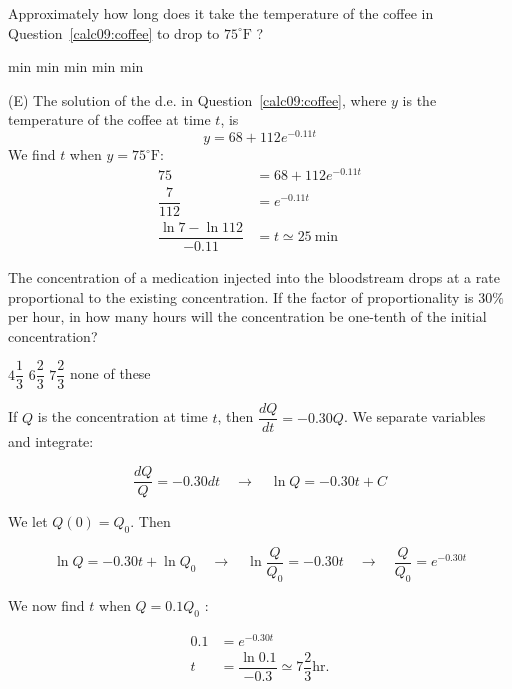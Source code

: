 \question
Approximately how long does it take the temperature of the coffee in Question~\ref{calc09:coffee} to drop to $75^{\circ} \mathrm{F}$ ?
\begin{choices}
   min
   min
   min
   min
   min
\end{choices}
\begin{solution}
(E) The solution of the d.e. in Question~\ref{calc09:coffee}, where $y$ is the temperature of the coffee at time $t$, is
\[
y=68+112 e^{-0.11 t}
\]
We find $t$ when $y=75^{\circ} \mathrm{F}$:
\[
\begin{aligned}
75 & =68+112 e^{-0.11 t} \\
\dfrac{7}{112} & =e^{-0.11 t} \\
\dfrac{\ln 7-\ln 112}{-0.11} & =t \simeq 25 \mathrm{~min}
\end{aligned}
\]
\end{solution}




\newpage



\question
The concentration of a medication injected into the bloodstream drops at a rate proportional to the existing concentration. If the factor of proportionality is $30 \%$ per hour, in how many hours will the concentration be one-tenth of the initial concentration?
\begin{choices}
  \choice $4 \dfrac{1}{3}$
  \choice $6 \dfrac{2}{3}$
  \CorrectChoice $7 \dfrac{2}{3}$
  \choice none of these
\end{choices}
\begin{solution}
If $Q$ is the concentration at time $t$, then $\dfrac{d Q}{d t}=-0.30 Q$. We separate variables and integrate:


\[
\dfrac{d Q}{Q}=-0.30 d t \quad \to \quad \ln Q=-0.30 t+C
\]

We let $Q(0)=Q_{0}$. Then

\[
\ln Q=-0.30 t+\ln Q_{0} \quad \to \quad \ln \dfrac{Q}{Q_{0}}=-0.30 t \quad \to \quad \dfrac{Q}{Q_{0}}=e^{-0.30 t}
\]

We now find $t$ when $Q=0.1 Q_{0}$ :

\[
\begin{aligned}
0.1 & =e^{-0.30 t} \\
t & =\dfrac{\ln 0.1}{-0.3} \simeq 7 \dfrac{2}{3} \mathrm{hr} .
\end{aligned}
\]


\end{solution}

